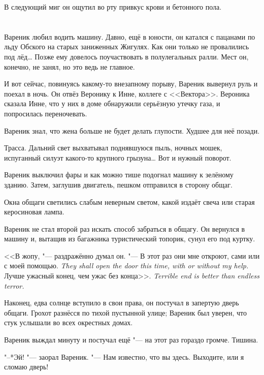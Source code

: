 В следующий миг он ощутил во рту привкус крови и бетонного пола.

\chapter{}

\textspace

\label{Thu_2012_08_30}

Вареник любил водить машину.
Давно, ещё в юности, он катался с пацанами по льду Обского на старых заниженных Жигулях.
Как они только не провалились под лёд\ldots{}
Позже ему довелось поучаствовать в полулегальных ралли.
Мест он, конечно, не занял, но это ведь не главное.

И вот сейчас, повинуясь какому-то внезапному порыву, Вареник вывернул руль и поехал в ночь.
Он отвёз Веронику к Инне, коллеге с <<Вектора>>.
Вероника сказала Инне, что у них в доме обнаружили серьёзную утечку газа, и попросилась переночевать.

Вареник знал, что жена больше не будет делать глупости.
Худшее для неё позади.

Трасса.
Дальний свет выхватывал поднявшуюся пыль, ночных мошек, испуганный силуэт какого-то крупного грызуна\ldots{}
Вот и нужный поворот.

Вареник выключил фары и как можно тише подогнал машину к зелёному зданию.
Затем, заглушив двигатель, пешком отправился в сторону общаг.

Окна общаги светились слабым неверным светом, какой издаёт свеча или старая керосиновая лампа.

Вареник не стал второй раз искать способ забраться в общагу.
Он вернулся в машину и, вытащив из багажника туристический топорик, сунул его под куртку.

<<В жопу, "--- раздражённо думал он.
{"--- В этот раз они мне откроют, сами или с моей помощью.}
{\textit{They shall open the door this time, with or without my help.}}
{Лучше ужасный конец, чем ужас без конца>>.}
{\textit{Terrible end is better than endless terror.}}

Наконец, едва солнце вступило в свои права, он постучал в запертую дверь общаги.
Грохот разнёсся по тихой пустынной улице;
Вареник был уверен, что стук услышали во всех окрестных домах.

Вареник выждал минуту и постучал ещё "--- на этот раз гораздо громче.
Тишина.

"--*Эй! "--- заорал Вареник.
"--- Нам известно, что вы здесь.
Выходите, или я сломаю дверь!

